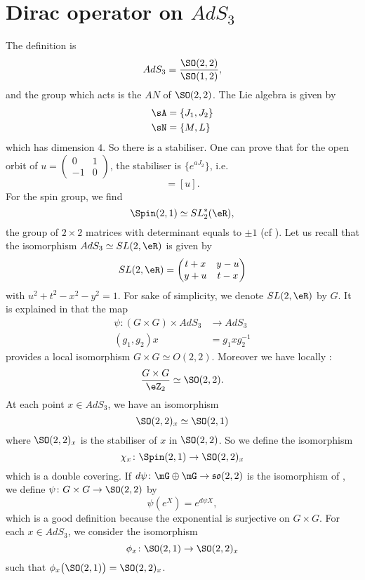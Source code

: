 
\section{Dirac operator on \texorpdfstring{$AdS_{3}$}{AdS3}}  \label{PgDiracAdSTrois}

The definition is 
\[ 
  AdS_{3}=\frac{ \SO(2,2) }{ \SO(1,2) },
\]
and the group which acts is the $AN$ of $\SO(2,2)$. The Lie algebra is given by
\[ 
\begin{split}
  \sA&=\{ J_{1},J_{2} \}\\
  \sN&=\{ M,L \}
\end{split}  
\]
which has dimension $4$. So there is a stabiliser. One can prove that for the open orbit of $u=\begin{pmatrix}
0&1\\-1&0
\end{pmatrix}$, the stabiliser is $\{  e^{aJ_{2}} \}$, i.e.
\begin{equation}
  [ e^{aJ_{2}}u]=[u].
\end{equation}
For the spin group, we find 
\[ 
  \Spin(2,1)\simeq SL_2^*(\eR),
\]
the group of $2\times 2$ matrices with determinant equals to $\pm 1$ (cf \cite{Michelson}). Let us recall that the isomorphism $AdS_{3}\simeq SL(2,\eR)$ is given by
\[ 
  SL(2,\eR)=\begin{pmatrix}
t+x&y-u\\
y+u&t-x
\end{pmatrix}
\]
with $u^{2}+t^{2}-x^{2}-y^{2}=1$. For sake of simplicity, we denote $SL(2,\eR)$ by $G$. It is explained in \cite{Clement} that the map
\begin{equation}
\begin{aligned}
 \psi\colon (G\times G)\times AdS_{3}&\to AdS_3 \\ 
(g_{1},g_{2})x&= g_{1}xg_{2}^{-1} 
\end{aligned}
\end{equation}
provides a local isomorphism $G\times G\simeq O(2,2)$. Moreover we have locally :
\[ 
  \frac{ G\times G }{ \eZ_{2} }\simeq \SO(2,2).
\]
At each point $x\in AdS_3$, we have an isomorphism
\[ 
  \SO(2,2)_{x}\simeq \SO(2,1)
\]
where $\SO(2,2)_{x}$ is the stabiliser of $x$ in $\SO(2,2)$. So we define the isomorphism
\[ 
  \chi_{x}\colon \Spin(2,1)\to \SO(2,2)_{x}
\]
which is a double covering. If $d\psi\colon \mG\oplus\mG\to \mathfrak{so}(2,2)$ is the isomorphism of \cite{Clement}, we define $\psi\colon G\times G\to \SO(2,2)$ by
\[ 
  \psi( e^{X})= e^{d\psi X},
\]
which is a good definition because the exponential is surjective on $G\times G$. For each $x\in AdS_3$, we consider the isomorphism
\[ 
  \phi_{x}\colon \SO(2,1)\to \SO(2,2)_{x}
\]
such that $\phi_{x}\big( \SO(2,1) \big)=\SO(2,2)_{x}$.

